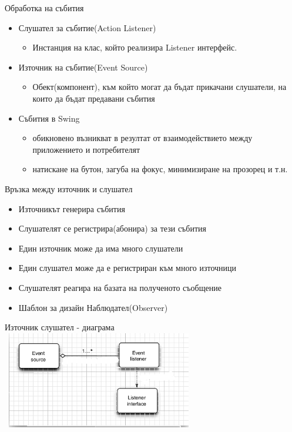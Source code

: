 \documentclass{beamer}
\begin{document}
\begin{frame}{Обработка на събития}
  \transdissolve
  \begin{itemize}
    \item Слушател за събитие(Action Listener)
    \begin{itemize}
    \item Инстанция на клас, който реализира Listener интерфейс.
    \end{itemize}
    \item Източник на събитие(Event Source)
      \begin{itemize}
      \item Обект(компонент), към който могат да бъдат прикачани слушатели, на
        които да бъдат предавани събития        
      \end{itemize}
    \item Събития в Swing
      \begin{itemize}
      \item обикновено възникват в резултат от взаимодействието
        между приложението и потребителят
      \item натискане на бутон, загуба на фокус, минимизиране на прозорец и т.н.
      \end{itemize}
  \end{itemize}
\end{frame}

\begin{frame}{Връзка между източник и слушател}
  \transdissolve
  \begin{itemize}
  \item Източникът генерира събития
  \item Слушателят се регистрира(абонира) за тези събития
  \item Един източник може да има много слушатели
  \item Един слушател може да е регистриран към много източници
  \item Слушателят реагира на базата на полученото съобщение
  \item Шаблон за дизайн Наблюдател(Observer)
  \end{itemize}
\end{frame}


\begin{frame}{Източник слушател - диаграма}
  \transdissolve
  \includegraphics[width=320px,height=160px]{images/event_source.png}  
\end{frame}
\end{document}
